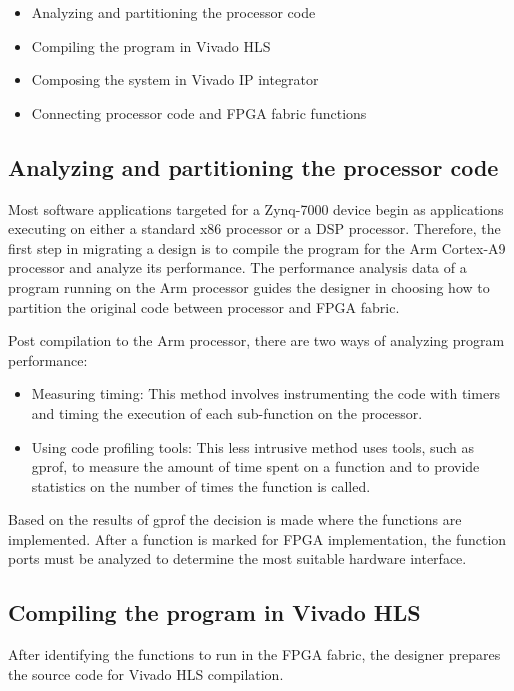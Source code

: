 \begin{itemize}
  \item Analyzing and partitioning the processor code
  \item Compiling the program in Vivado HLS
  \item Composing the system in Vivado IP integrator
  \item Connecting processor code and FPGA fabric functions
\end{itemize}

\subsection{Analyzing and partitioning the processor code}
Most software applications targeted for a Zynq-7000 device begin as applications executing on either a standard x86 processor or a DSP processor. Therefore, the first step in migrating a design is to compile the program for the Arm Cortex-A9 processor and analyze its performance. The performance analysis data of a program running on the Arm processor
guides the designer in choosing how to partition the original code between processor and FPGA fabric.

\par Post compilation to the Arm processor, there are two ways of analyzing program performance:
\begin{itemize}
  \item Measuring timing: This method involves instrumenting the code with timers and timing the execution of each sub-function on the processor.
  \item Using code profiling tools: This less intrusive method uses tools, such as gprof, to measure the amount of time spent on a function and to provide statistics on the number of times the function is called.
\end{itemize}

Based on the results of gprof the decision is made where the functions are implemented. After a function is marked for FPGA implementation, the function ports must be analyzed to determine the most suitable hardware interface.


\subsection{Compiling the program in Vivado HLS}

After identifying the functions to run in the FPGA fabric, the designer prepares the source
code for Vivado HLS compilation. 

